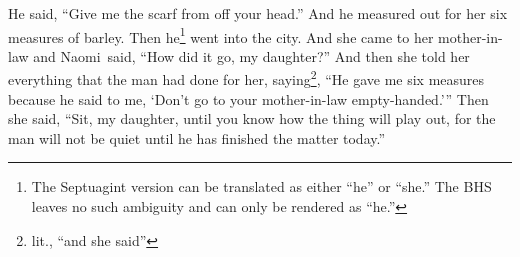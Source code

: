 \begin{inparaenum}
     He said, ``Give me the scarf from off your head.'' And he measured out for her six measures of barley. Then he\footnote{The Septuagint version can be translated as either ``he'' or ``she.'' The BHS leaves no such ambiguity and can only be rendered as ``he.''} went into the city.%
     And she came to her mother-in-law and Naomi\understood\ said, ``How did it go, my daughter?'' And then she told her everything that the man had done for her,%
     saying\footnote{lit., ``and she said''}, ``He gave me six measures because he said to me, `Don't go to your mother-in-law empty-handed.'\thinspace''%
     Then she said, ``Sit, my daughter, until you know how the thing will play out, for the man will not be quiet until he has finished the matter today.''%
\end{inparaenum}
